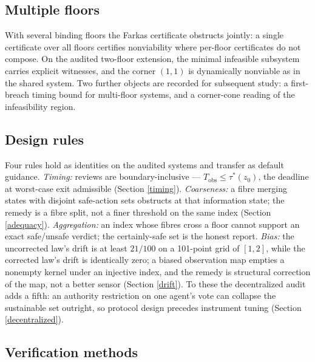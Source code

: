 \documentclass[10pt,twocolumn]{article}
\theoremstyle{definition}
\begin{document}
\subsection{Multiple floors}\label{floors}

With several binding floors the Farkas certificate obstructs jointly: a
single certificate over all floors certifies nonviability where
per-floor certificates do not compose. On the audited two-floor
extension, the minimal infeasible subsystem carries explicit
witnesses, and the corner \((1,1)\) is dynamically nonviable as in the
shared system. Two further objects are recorded for subsequent study: a
first-breach timing bound for multi-floor systems, and a corner-cone
reading of the infeasibility region.

\subsection{Design rules}\label{rules}

Four rules hold as identities on the audited systems and transfer as
default guidance. \emph{Timing:} reviews are boundary-inclusive ---
\(T_{\mathrm{obs}} \le \tau^{*}(z_0)\), the deadline at worst-case
exit admissible (Section \ref{timing}). \emph{Coarseness:} a fibre
merging states with disjoint safe-action sets obstructs at that
information state; the remedy is a fibre split, not a finer threshold
on the same index (Section \ref{adequacy}). \emph{Aggregation:} an
index whose fibres cross a floor cannot support an exact
safe/unsafe verdict; the certainly-safe set is the honest report.
\emph{Bias:} the uncorrected law's drift is at least \(21/100\) on a
101-point grid of \([1,2]\), while the corrected law's drift is
identically zero; a biased observation map empties a nonempty kernel
under an injective index, and the remedy is structural correction of
the map, not a better sensor (Section \ref{drift}). To these the
decentralized audit adds a fifth: an authority restriction on one
agent's vote can collapse the sustainable set outright, so protocol
design precedes instrument tuning (Section \ref{decentralized}).

\subsection{Verification methods}\label{methods}
\end{document}
